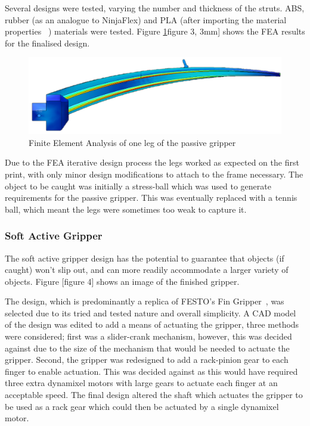 \documentclass[conference]{IEEEtran}
\begin{document}
Several designs were tested, varying the number and thickness of the struts. ABS, rubber (as an analogue to NinjaFlex) and PLA (after importing the material properties ~\cite{CRF3:CRF3126}) materials were tested. Figure \ref{fea1}figure 3, 3mm] shows the FEA results for the finalised design.

\begin{figure}\label{fea1}
	\centering
	\includegraphics[scale=0.15]{fea1.png}
	\caption{Finite Element Analysis of one leg of the passive gripper}
\end{figure}

Due to the FEA iterative design process the legs worked as expected on the first print, with only minor design modifications to attach to the frame necessary. The object to be caught was initially a stress-ball which was used to generate requirements for the passive gripper. This was eventually replaced with a tennis ball, which meant the legs were sometimes too weak to capture it. 
\subsubsection{Soft Active Gripper}
The soft active gripper design has the potential to guarantee that objects (if caught) won’t slip out, and can more readily accommodate a larger variety of objects. Figure [figure 4] shows an image of the finished gripper.

The design, which is predominantly a replica of FESTO’s Fin Gripper~\cite{festofin}, was selected due to its tried and tested nature and overall simplicity. A CAD model of the design was edited to add a means of actuating the gripper, three methods were considered; first was a slider-crank mechanism, however, this was decided against due to the size of the mechanism that would be needed to actuate the gripper. Second, the gripper was redesigned to add a rack-pinion gear to each finger to enable actuation. This was decided against as this would have required three extra dynamixel motors with large gears to actuate each finger at an acceptable speed. The final design altered the shaft which actuates the gripper to be used as a rack gear which could then be actuated by a single dynamixel motor.
\end{document}
